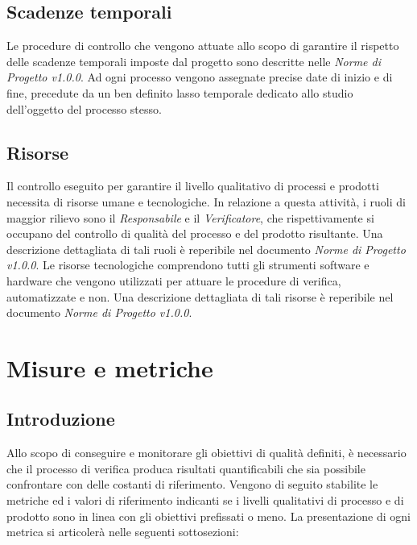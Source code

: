 \documentclass[openany,12pt,a4paper]{report}
\begin{document}
    \section{Scadenze temporali}
    
    Le procedure di controllo che vengono attuate allo scopo di garantire il rispetto delle scadenze temporali imposte dal progetto sono descritte nelle \textit{Norme di Progetto v1.0.0}. Ad ogni processo vengono assegnate precise date di inizio e di fine, precedute da un ben definito lasso temporale dedicato allo studio dell'oggetto del processo stesso.
    
    \section{Risorse}
    
    Il controllo eseguito per garantire il livello qualitativo di processi e prodotti necessita di risorse umane e tecnologiche. In relazione a questa attività, i ruoli di maggior rilievo sono il \textit{Responsabile} e il \textit{Verificatore}, che rispettivamente si occupano del controllo di qualità del processo e del prodotto risultante. Una descrizione dettagliata di tali ruoli è reperibile nel documento \textit{Norme di Progetto v1.0.0}. 
    Le risorse tecnologiche comprendono tutti gli strumenti software e hardware che vengono utilizzati per attuare le procedure di verifica, automatizzate e non. Una descrizione dettagliata di tali risorse è reperibile nel documento \textit{Norme di Progetto v1.0.0}. 



\chapter{Misure e metriche}

\section{Introduzione}

Allo scopo di conseguire e monitorare gli obiettivi di qualità definiti, è necessario che il processo di verifica produca risultati quantificabili che sia possibile confrontare con delle costanti di riferimento. Vengono di seguito stabilite le metriche ed i valori di riferimento indicanti se i livelli qualitativi di processo e di prodotto sono in linea con gli obiettivi prefissati o meno. La presentazione di ogni metrica si articolerà nelle seguenti sottosezioni:
\end{document}
